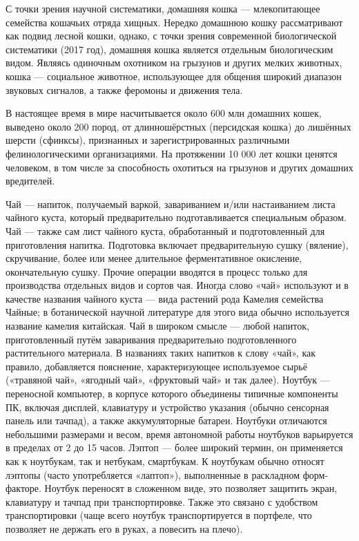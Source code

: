 \begin{frame}
	С точки зрения научной систематики, домашняя кошка — млекопитающее семейства кошачьих отряда хищных. Нередко домашнюю кошку рассматривают как подвид лесной кошки, однако, с точки зрения современной биологической систематики (2017 год), домашняя кошка является отдельным биологическим видом. Являясь одиночным охотником на грызунов и других мелких животных, кошка — социальное животное, использующее для общения широкий диапазон звуковых сигналов, а также феромоны и движения тела.
\end{frame}

\begin{frame}
	В настоящее время в мире насчитывается около 600 млн домашних кошек, выведено около 200 пород, от длинношёрстных (персидская кошка) до лишённых шерсти (сфинксы), признанных и зарегистрированных различными фелинологическими организациями. На протяжении 10 000 лет кошки ценятся человеком, в том числе за способность охотиться на грызунов и других домашних вредителей.
\end{frame}

\begin{frame}
	Чай — напиток, получаемый варкой, завариванием и/или настаиванием листа чайного куста, который предварительно подготавливается специальным образом. Чай — также сам лист чайного куста, обработанный и подготовленный для приготовления напитка. Подготовка включает предварительную сушку (вяление), скручивание, более или менее длительное ферментативное окисление, окончательную сушку. Прочие операции вводятся в процесс только для производства отдельных видов и сортов чая. Иногда слово «чай» используют и в качестве названия чайного куста — вида растений рода Камелия семейства Чайные; в ботанической научной литературе для этого вида обычно используется название камелия китайская. Чай в широком смысле — любой напиток, приготовленный путём заваривания предварительно подготовленного растительного материала. В названиях таких напитков к слову «чай», как правило, добавляется пояснение, характеризующее используемое сырьё («травяной чай», «ягодный чай», «фруктовый чай» и так далее). Ноутбук — переносной компьютер, в корпусе которого объединены типичные компоненты ПК, включая дисплей, клавиатуру и устройство указания (обычно сенсорная панель или тачпад), а также аккумуляторные батареи. Ноутбуки отличаются небольшими размерами и весом, время автономной работы ноутбуков варьируется в пределах от 2 до 15 часов. Лэптоп — более широкий термин, он применяется как к ноутбукам, так и нетбукам, смартбукам. К ноутбукам обычно относят лэптопы (часто употребляется «лаптоп»), выполненные в раскладном форм-факторе. Ноутбук переносят в сложенном виде, это позволяет защитить экран, клавиатуру и тачпад при транспортировке. Также это связано с удобством транспортировки (чаще всего ноутбук транспортируется в портфеле, что позволяет не держать его в руках, а повесить на плечо).
\end{frame}

